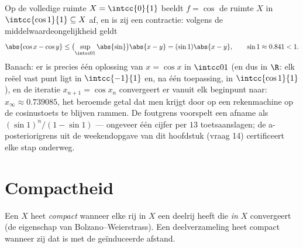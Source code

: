 \begin{example}[Een numeriek vast punt: $x = \cos x$]\label{ex:b2:metric:cosfix}
Op de volledige ruimte $X = \intcc{0}{1}$ beeldt $f = \cos$ de
ruimte $X$ in $\intcc{\cos 1}{1} \subseteq X$ af, en is zij een
contractie: volgens de middelwaardeongelijkheid geldt
\[
\abs{\cos x - \cos y} \leq \bigl(\sup_{\intcc01}\abs{\sin}\bigr)
\abs{x - y} = (\sin 1)\abs{x - y},
\qquad \sin 1 \approx 0.841 < 1 .
\]
Banach: er is precies één oplossing van $x = \cos x$ in
$\intcc01$ (en dus in $\R$: elk reëel vast punt ligt in
$\intcc{-1}{1}$ en, na één toepassing, in $\intcc{\cos 1}{1}$), en
de iteratie $x_{n+1} = \cos x_n$ convergeert er vanuit elk
beginpunt naar: $x_\infty \approx 0.739085$, het beroemde getal dat
men krijgt door op een rekenmachine op de cosinustoets te blijven
rammen. De foutgrens voorspelt een afname als $(\sin1)^n/(1 -
\sin1)$ --- ongeveer één cijfer per $13$ toetsaanslagen; de
a-posteriorigrens uit de weekendopgave van dit hoofdstuk (vraag
14) certificeert elke stap onderweg.
\end{example}

\section{Compactheid}

\begin{definition}\label{def:b2:metric:compact}
Een  $X$ heet \emph{compact} wanneer elke rij in $X$ een deelrij heeft die
\emph{in} $X$ convergeert (de eigenschap van
Bolzano--Weierstrass). Een deelverzameling heet compact wanneer zij
dat is met de geïnduceerde afstand.
\end{definition}

